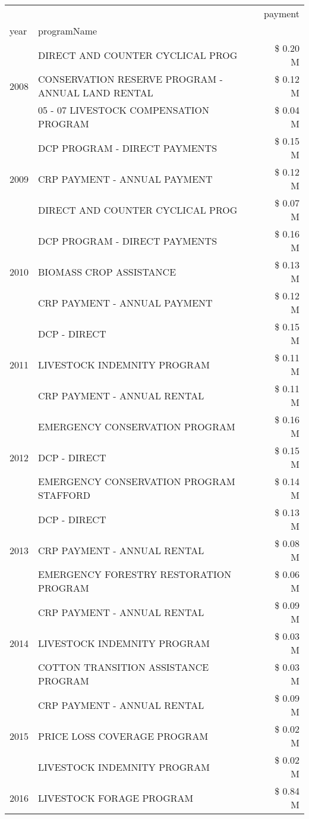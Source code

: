 \begin{tabular}{llr}
\toprule
 &  & payment \\
year & programName &  \\
\midrule
\multirow[t]{3}{*}{2008} & DIRECT AND COUNTER CYCLICAL PROG & \$ 0.20 M \\
 & CONSERVATION RESERVE PROGRAM - ANNUAL LAND RENTAL & \$ 0.12 M \\
 & 05 - 07 LIVESTOCK COMPENSATION PROGRAM & \$ 0.04 M \\
\cline{1-3}
\multirow[t]{3}{*}{2009} & DCP PROGRAM - DIRECT PAYMENTS & \$ 0.15 M \\
 & CRP PAYMENT - ANNUAL PAYMENT & \$ 0.12 M \\
 & DIRECT AND COUNTER CYCLICAL PROG & \$ 0.07 M \\
\cline{1-3}
\multirow[t]{3}{*}{2010} & DCP PROGRAM - DIRECT PAYMENTS & \$ 0.16 M \\
 & BIOMASS CROP ASSISTANCE & \$ 0.13 M \\
 & CRP PAYMENT - ANNUAL PAYMENT & \$ 0.12 M \\
\cline{1-3}
\multirow[t]{3}{*}{2011} & DCP - DIRECT & \$ 0.15 M \\
 & LIVESTOCK INDEMNITY PROGRAM & \$ 0.11 M \\
 & CRP PAYMENT - ANNUAL RENTAL & \$ 0.11 M \\
\cline{1-3}
\multirow[t]{3}{*}{2012} & EMERGENCY CONSERVATION PROGRAM & \$ 0.16 M \\
 & DCP - DIRECT & \$ 0.15 M \\
 & EMERGENCY CONSERVATION PROGRAM STAFFORD & \$ 0.14 M \\
\cline{1-3}
\multirow[t]{3}{*}{2013} & DCP - DIRECT & \$ 0.13 M \\
 & CRP PAYMENT - ANNUAL RENTAL & \$ 0.08 M \\
 & EMERGENCY FORESTRY RESTORATION PROGRAM & \$ 0.06 M \\
\cline{1-3}
\multirow[t]{3}{*}{2014} & CRP PAYMENT - ANNUAL RENTAL & \$ 0.09 M \\
 & LIVESTOCK INDEMNITY PROGRAM & \$ 0.03 M \\
 & COTTON TRANSITION ASSISTANCE PROGRAM & \$ 0.03 M \\
\cline{1-3}
\multirow[t]{3}{*}{2015} & CRP PAYMENT - ANNUAL RENTAL & \$ 0.09 M \\
 & PRICE LOSS COVERAGE PROGRAM & \$ 0.02 M \\
 & LIVESTOCK INDEMNITY PROGRAM & \$ 0.02 M \\
\cline{1-3}
\multirow[t]{3}{*}{2016} & LIVESTOCK FORAGE PROGRAM                      & \$ 0.84 M \\

\end{tabular}
